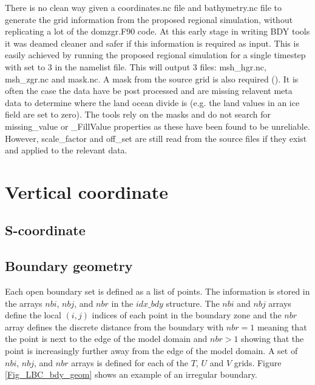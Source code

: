 There is no clean way given a coordinates.nc file and bathymetry.nc file to generate the grid information
from the proposed regional simulation, without replicating a lot of the domzgr.F90  code. At this early stage
in writing BDY tools it was deamed cleaner and safer if this information is required as input. This is easily 
achieved by running the proposed regional simulation for a single timestep with  set to 3 in the 
\NEMO namelist file. This will output 3 files: msh\_hgr.nc, msh\_zgr.nc and mask.nc.
A mask from the source grid is also required (). It is often the case the data have
be post processed and are missing relavent meta data to determine where the land ocean divide 
is (e.g. the land values in an ice field are set to zero). The tools rely on the masks and do not 
search for missing\_value or \_FillValue properties as these have been found to be unreliable. 
However, scale\_factor and off\_set are still read from the source files if they exist and applied to
the relevant data.

\section{Vertical coordinate}
\label{vert_coord}

\subsection{S-coordinate}
\label{s_coord}




\subsection{Boundary geometry}
\label{BDY_geometry}

Each open boundary set is defined as a list of points. The
information
is stored in the arrays $nbi$, $nbj$, and $nbr$ in the
$idx\_bdy$
structure.  The $nbi$ and $nbj$ arrays
define the local $(i,j)$ indices of each point in the boundary
zone
and the $nbr$ array defines the discrete distance from the
boundary
with $nbr=1$ meaning that the point is next to the edge of the
model domain and $nbr>1$ showing that the point is increasingly
further away from the edge of the model domain. A set of $nbi$,
$nbj$,
and $nbr$ arrays is defined for each of the $T$, $U$ and $V$
grids. Figure \ref{Fig_LBC_bdy_geom} shows an example of an
irregular
boundary. 

